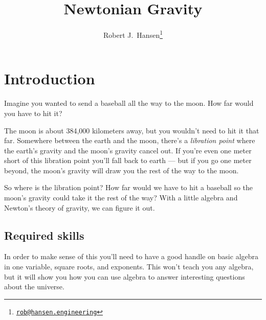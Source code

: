 \documentclass[10pt,twocolumn,letterpaper,preprint]{article}
\begin{document}
\title{Newtonian Gravity}
\author{Robert J.\ Hansen\thanks{\href{mailto:rob@hansen.engineering}{\nolinkurl{rob@hansen.engineering}}}}
\saythanks
\tableofcontents
\section{Introduction}
Imagine you wanted to send a baseball all the way to the moon.  How far would
you have to hit it?

The moon is about 384,000 kilometers away, but you
wouldn't need to hit it that far.  Somewhere between the earth and the moon,
there's a \textit{libration point} where the earth's gravity and the moon's
gravity cancel out.  If you're even one meter short of this libration point
you'll fall back to earth --- but if you go one meter beyond, the moon's gravity
will draw you the rest of the way to the moon.

So where is the libration point?  How far would we have to hit a baseball so
the moon's gravity could take it the rest of the way?  With a little algebra
and Newton's theory of gravity, we can figure it out.

\subsection{Required skills}
In order to make sense of this you'll need to have a good handle on basic
algebra in one variable, square roots, and exponents.  This won't teach you
any algebra, but it will show you how you can use algebra to answer
interesting questions about the universe.
\end{document}
